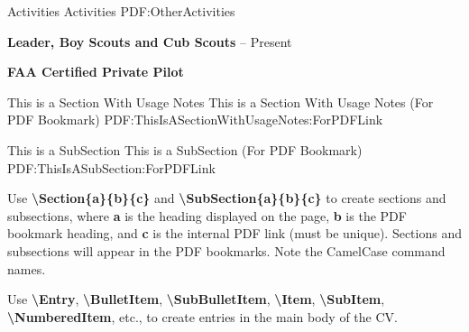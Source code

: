 \documentclass[letterpaper,MMMMyyyy,nonstopmode]{simpleresumecv}
\newcommand{\Code}[1]{\mbox{\textbf{#1}}}
\newcommand{\CodeCommand}[1]{\mbox{\textbf{\textbackslash{#1}}}}
\begin{document}
\begin{Body}

\iffalse
\Section
{Publications}
{Publications}
{PDF:Publications}

\SubSection
{Technical Editor}
{Technical Editor}
{PDF:TechnicalEditor}

\Entry
\href{https://www.amazon.com/Oracle-Certified-Associate-ProgrammerStudy/dp/1849687323}
{Reece, Richard M. \textit{Oracle Certified Associate, Java SE 7 Programmer Study Guide}, Packt Publishing, 2012}

\Gap
\Entry
\href
{https://www.amazon.com/Java-Concurrency-Cookbook-FernandezJavier/dp/1849687889}
{Gonzalez, Javier Fernandez. \textit{Java 7 Concurrency Cookbook}, Packt Publishing, 2012}
\fi

\Section
{Activities}
{Activities}
{PDF:OtherActivities}

\Entry
\textbf{Leader, Boy Scouts and Cub Scouts}
\hfill
{} -- Present

\Entry
\textbf{FAA Certified Private Pilot}

\iffalse
\newpage
\begingroup
\color{red}

\Section
{This is a\newline
Section\newline
With\newline
Usage Notes}
{This is a Section With Usage Notes (For PDF Bookmark)}
{PDF:ThisIsASectionWithUsageNotes:ForPDFLink}

\SubSection
{This is a SubSection}
{This is a SubSection (For PDF Bookmark)}
{PDF:ThisIsASubSection:ForPDFLink}

\Gap
\BulletItem
Use \CodeCommand{Section\{a\}\{b\}\{c\}} and
\CodeCommand{SubSection\{a\}\{b\}\{c\}}
to create sections and subsections, where
\Code{a} is the heading displayed on the page,
\Code{b} is the PDF bookmark heading, and
\Code{c} is the internal PDF link (must be unique).
Sections and subsections will appear in the PDF bookmarks.
Note the CamelCase command names.

\Gap
\BulletItem
Use
\CodeCommand{Entry},
\CodeCommand{BulletItem},
\CodeCommand{SubBulletItem},
\CodeCommand{Item},
\CodeCommand{SubItem},
\CodeCommand{NumberedItem},
etc.,
to create entries in the main body of the CV.


\end{Body}
\end{document}
